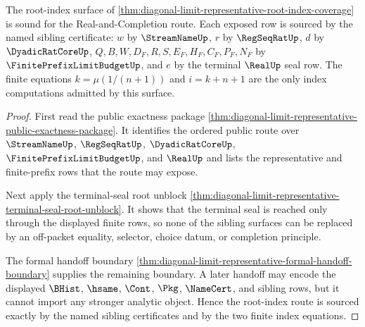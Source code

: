 \begin{theorem}
\label{thm:diagonal-limit-representative-root-index-soundness}
The root-index surface of \autoref{thm:diagonal-limit-representative-root-index-coverage} is sound for the Real-and-Completion route. Each exposed row is sourced by the named sibling certificate: $w$ by $\StreamNameUp$, $r$ by $\RegSeqRatUp$, $d$ by $\DyadicRatCoreUp$, $Q,B,W,D_F,R,S,E_F,H_F,C_F,P_F,N_F$ by $\FinitePrefixLimitBudgetUp$, and $e$ by the terminal $\RealUp$ seal row. The finite equations $k=\mu(1/(n+1))$ and $i=k+n+1$ are the only index computations admitted by this surface.
\end{theorem}
\begin{proof}
First read the public exactness package \autoref{thm:diagonal-limit-representative-public-exactness-package}. It identifies the ordered public route over $\StreamNameUp$, $\RegSeqRatUp$, $\DyadicRatCoreUp$, $\FinitePrefixLimitBudgetUp$, and $\RealUp$ and lists the representative and finite-prefix rows that the route may expose.

Next apply the terminal-seal root unblock \autoref{thm:diagonal-limit-representative-terminal-seal-root-unblock}. It shows that the terminal seal is reached only through the displayed finite rows, so none of the sibling surfaces can be replaced by an off-packet equality, selector, choice datum, or completion principle.

The formal handoff boundary \autoref{thm:diagonal-limit-representative-formal-handoff-boundary} supplies the remaining boundary. A later handoff may encode the displayed $\BHist$, $\hsame$, $\Cont$, $\Pkg$, $\NameCert$, and sibling rows, but it cannot import any stronger analytic object. Hence the root-index route is sourced exactly by the named sibling certificates and by the two finite index equations.
\end{proof}

